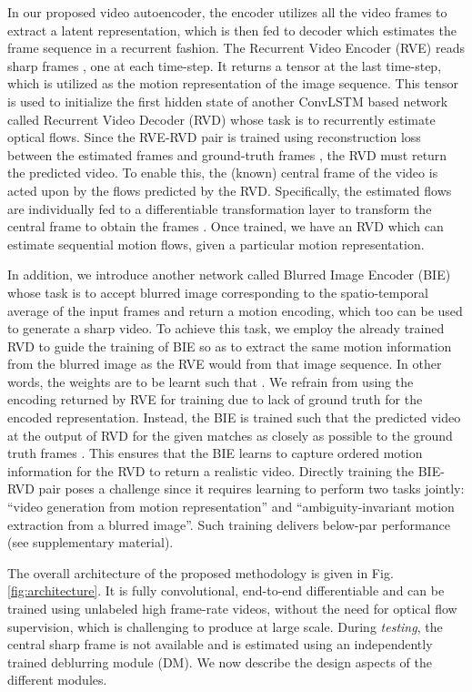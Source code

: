 \documentclass[10pt,twocolumn,letterpaper]{article}
\begin{document}
In our proposed video autoencoder, the encoder utilizes all the video frames to extract a latent representation, which is then fed to decoder which estimates the frame sequence in a recurrent fashion. The Recurrent Video Encoder (RVE) reads  sharp frames , one at each time-step. It returns a tensor at the last time-step, which is utilized as the motion representation of the image sequence. This tensor is used to initialize the first hidden state of another ConvLSTM based network called Recurrent Video Decoder (RVD) whose task is to recurrently estimate  optical flows. Since the RVE-RVD pair is trained using reconstruction loss between the estimated frames  and ground-truth frames , the RVD must return the predicted video. To enable this, the (known) central frame of the video is acted upon by the flows predicted by the RVD. Specifically, the estimated flows are individually fed to a differentiable transformation layer to transform the central frame  to obtain the frames . Once trained, we have an RVD which can estimate sequential motion flows, given a particular motion representation.

In addition, we introduce another network called Blurred Image Encoder (BIE) whose task is to accept blurred image  corresponding to the spatio-temporal average of the input frames  and return a motion encoding, which too can be used to generate a sharp video.  
To achieve this task, we employ the already trained RVD to guide the training of BIE so as to extract the same motion information from the blurred image as the RVE would from that image sequence. In other words, the weights are to be learnt such that . We refrain from using the encoding returned by RVE for training due to lack of ground truth for the encoded representation. Instead, the BIE is trained such that the predicted video at the output of RVD for the given  matches as closely as possible to the ground truth frames . This ensures that the BIE learns to capture ordered motion information for the RVD to return a realistic video. Directly training the BIE-RVD pair poses a challenge since it requires learning to perform two tasks jointly: ``video generation from motion representation'' and ``ambiguity-invariant motion extraction from a blurred image''. Such training delivers below-par performance (see supplementary material).


The overall architecture of the proposed methodology is given in Fig. \ref{fig:architecture}. It is fully convolutional, end-to-end differentiable and can be trained using unlabeled high frame-rate videos, without the need for optical flow supervision, which is challenging to produce at large scale. During \emph{testing}, the central sharp frame is not available and is estimated using an independently trained deblurring module (DM). We now describe the design aspects of the different modules.
\end{document}
